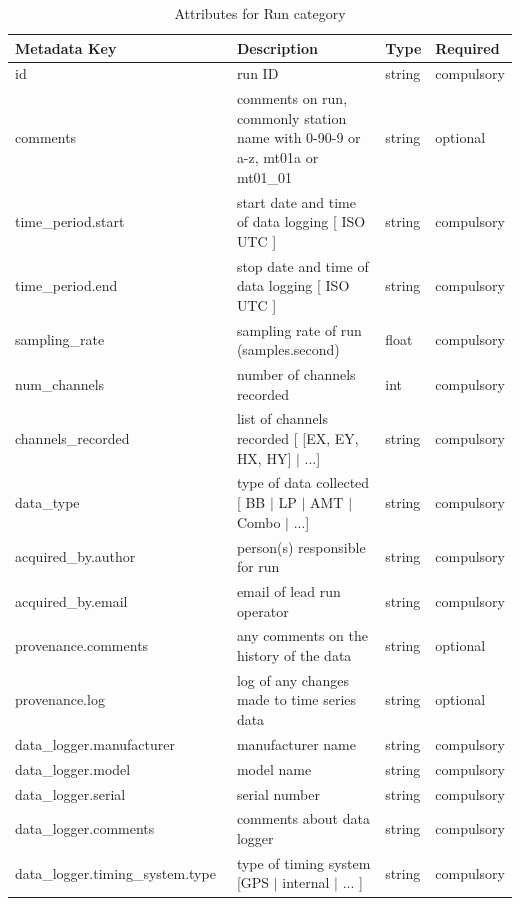 \documentclass{article}
\begin{document}
\begin{table}[htb!]
    \caption[Attributes for Run]{Attributes for Run category}
    \begin{tabular}{|l|p{3.4in}|l|l|}
        \hline
        \textbf{Metadata Key} & \textbf{Description} & \textbf{Type} & \textbf{Required} \\ \hline
        id\ & run ID & string & compulsory \\ \hline
        comments\ & comments on run, commonly station name with {0-9}{0-9} or {a-z}, mt01a or mt01\_01 & string & optional \\ \hline
        time\_period.start\ & start date and time of data logging [ ISO UTC ] & string & compulsory \\ \hline
        time\_period.end\ & stop date and time of data logging [ ISO UTC ] & string & compulsory \\ \hline
        sampling\_rate\ & sampling rate of run (samples.second) & float & compulsory \\ \hline
        num\_channels\ & number of channels recorded & int & compulsory \\ \hline
        channels\_recorded\ & list of channels recorded [ [EX, EY, HX, HY] $|$ ...] & string & compulsory \\ \hline
        data\_type \ & type of data collected [ BB $|$ LP $|$ AMT $|$ Combo $|$ ...] & string & compulsory \\ \hline
        acquired\_by.author\ & person(s) responsible for run & string & compulsory \\ \hline
        acquired\_by.email\ & email of lead run operator & string & compulsory \\ \hline
        provenance.comments\ & any comments on the history of the data & string & optional \\ \hline
        provenance.log\ & log of any changes made to time series data & string & optional \\ \hline
        data\_logger.manufacturer\ & manufacturer name & string & compulsory \\ \hline
        data\_logger.model\ & model name & string & compulsory \\ \hline
        data\_logger.serial\ & serial number & string & compulsory \\ \hline
        data\_logger.comments\ & comments about data logger & string & compulsory \\ \hline
        data\_logger.timing\_system.type\ & type of timing system [GPS $|$ internal $|$ ... ] & string & compulsory \\ \hline

\end{tabular}
\end{table}
\end{document}
